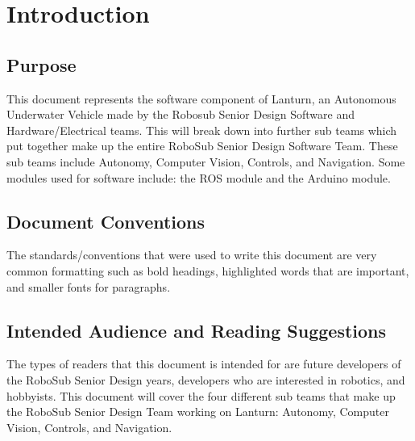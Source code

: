 \section{Introduction}
\label{sec:introduction}

\subsection{Purpose}
\label{sec:purpose}

This document represents the software component of Lanturn, an Autonomous
Underwater Vehicle made by the Robosub Senior Design Software and
Hardware/Electrical teams. This will break down into further sub teams which
put together make up the entire RoboSub Senior Design Software Team. These sub
teams include Autonomy, Computer Vision, Controls, and Navigation. Some modules
used for software include: the ROS module and the Arduino module.
\par

\subsection{Document Conventions}
\label{sec:conventions}

The standards/conventions that were used to write this document are very common
formatting such as bold headings, highlighted words that are important, and
smaller fonts for paragraphs.
\par

\subsection{Intended Audience and Reading Suggestions}
\label{sec:audience}

The types of readers that this document is intended for are future developers
of the RoboSub Senior Design years, developers who are interested in robotics,
and hobbyists.  This document will cover the four different sub teams that make
up the RoboSub Senior Design Team working on Lanturn: Autonomy, Computer
Vision, Controls, and Navigation. 
\par

